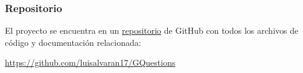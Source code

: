 \documentclass[../Main.tex]{subfiles}
\begin{document}
    \subsubsection{Repositorio}
    \begin{justify}
    
    El proyecto se encuentra en un \href{https://github.com/luisalvaran17/GQuestions}{repositorio} de GitHub con todos los archivos de código y documentación relacionada:
    
    \begin{center}
        \url{https://github.com/luisalvaran17/GQuestions}
    \end{center}
    
    \end{justify}
\end{document}
